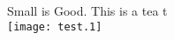 \documentclass{article}
\begin{document}
Small is Good.
This is a tea t
\\
\texttt{[image: test.1]}
\end{document}
